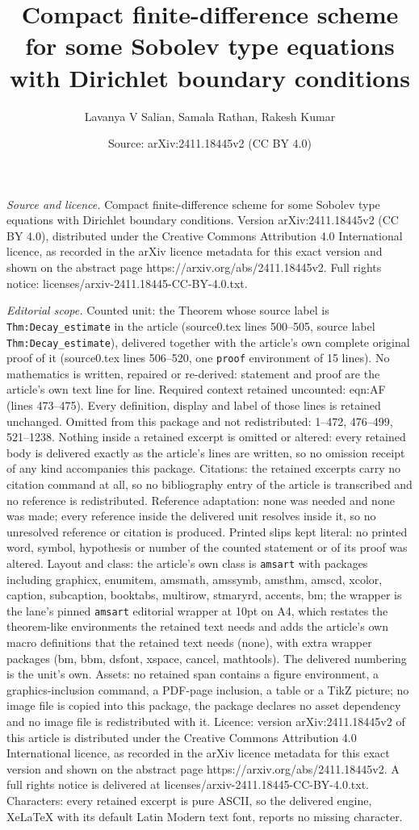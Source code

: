 \documentclass[10pt,a4paper]{amsart}
\title[Compact finite-difference scheme for some Sobolev type equat]{Compact finite-difference scheme for some Sobolev type equations with Dirichlet boundary conditions}
\author{Lavanya V Salian, Samala Rathan, Rakesh Kumar}
\date{Source: arXiv:2411.18445v2 (CC BY 4.0)}
\begin{document}
\maketitle

\noindent\emph{Source and licence.} Compact finite-difference scheme for some Sobolev type equations with Dirichlet boundary conditions. Version arXiv:2411.18445v2 (CC BY 4.0), distributed under the Creative Commons Attribution 4.0 International licence, as recorded in the arXiv licence metadata for this exact version and shown on the abstract page https://arxiv.org/abs/2411.18445v2. Full rights notice: licenses/arxiv-2411.18445-CC-BY-4.0.txt.\par\smallskip

\noindent\textit{Editorial scope.} Counted unit: the Theorem whose source label is \texttt{Thm:Decay\_estimate} in the article (source0.tex lines 500--505, source label \texttt{Thm:Decay\_estimate}), delivered together with the article's own complete original proof of it (source0.tex lines 506--520, one \texttt{proof} environment of 15 lines). No mathematics is written, repaired or re-derived: statement and proof are the article's own text line for line. Required context retained uncounted: eqn:AF (lines 473--475). Every definition, display and label of those lines is retained unchanged. Omitted from this package and not redistributed: 1--472, 476--499, 521--1238. Nothing inside a retained excerpt is omitted or altered: every retained body is delivered exactly as the article's lines are written, so no omission receipt of any kind accompanies this package. Citations: the retained excerpts carry no citation command at all, so no bibliography entry of the article is transcribed and no reference is redistributed. Reference adaptation: none was needed and none was made; every reference inside the delivered unit resolves inside it, so no unresolved reference or citation is produced. Printed slips kept literal: no printed word, symbol, hypothesis or number of the counted statement or of its proof was altered. Layout and class: the article's own class is \texttt{amsart} with packages including graphicx, enumitem, amsmath, amssymb, amsthm, amscd, xcolor, caption, subcaption, booktabs, multirow, stmaryrd, accents, bm; the wrapper is the lane's pinned \texttt{amsart} editorial wrapper at 10pt on A4, which restates the theorem-like environments the retained text needs and adds the article's own macro definitions that the retained text needs (none), with extra wrapper packages (bm, bbm, dsfont, xspace, cancel, mathtools). The delivered numbering is the unit's own. Assets: no retained span contains a figure environment, a graphics-inclusion command, a PDF-page inclusion, a table or a TikZ picture; no image file is copied into this package, the package declares no asset dependency and no image file is redistributed with it. Licence: version arXiv:2411.18445v2 of this article is distributed under the Creative Commons Attribution 4.0 International licence, as recorded in the arXiv licence metadata for this exact version and shown on the abstract page https://arxiv.org/abs/2411.18445v2. A full rights notice is delivered at licenses/arxiv-2411.18445-CC-BY-4.0.txt. Characters: every retained excerpt is pure ASCII, so the delivered engine, XeLaTeX with its default Latin Modern text font, reports no missing character.
\end{document}
